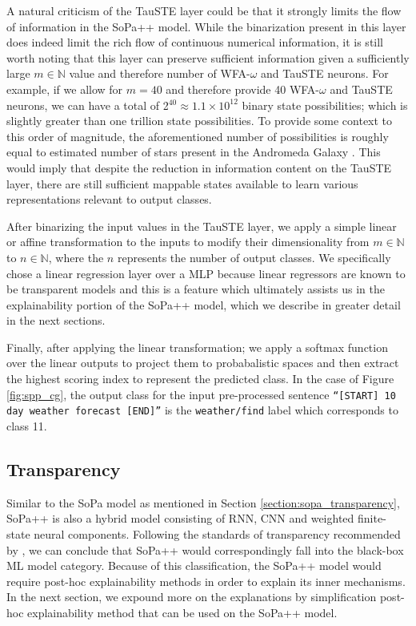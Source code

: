 A natural criticism of the TauSTE layer could be that it strongly limits the
flow of information in the SoPa++ model. While the binarization present in this
layer does indeed limit the rich flow of continuous numerical information, it is
still worth noting that this layer can preserve sufficient information given a
sufficiently large $m \in \mathbb{N}$ value and therefore number of WFA-$\omega$
and TauSTE neurons. For example, if we allow for $m=40$ and therefore provide 40
WFA-$\omega$ and TauSTE neurons, we can have a total of
2$^{40}\approx1.1\times10^{12}$ binary state possibilities; which is slightly
greater than one trillion state possibilities. To provide some context to this
order of magnitude, the aforementioned number of possibilities is roughly equal
to estimated number of stars present in the Andromeda Galaxy
\citep{10.1093/mnras/stu879}. This would imply that despite the reduction in
information content on the TauSTE layer, there are still sufficient mappable
states available to learn various representations relevant to output classes.

After binarizing the input values in the TauSTE layer, we apply a simple linear
or affine transformation to the inputs to modify their dimensionality from $m
\in \mathbb{N}$ to $n \in \mathbb{N}$, where the $n$ represents the number of
output classes. We specifically chose a linear regression layer over a MLP
because linear regressors are known to be transparent models
\citep{arrieta2020explainable} and this is a feature which ultimately assists us
in the explainability portion of the SoPa++ model, which we describe in greater
detail in the next sections.

Finally, after applying the linear transformation; we apply a softmax function
over the linear outputs to project them to probabalistic spaces and then extract
the highest scoring index to represent the predicted class. In the case of
Figure \ref{fig:spp_cg}, the output class for the input pre-processed sentence
\texttt{``[START] 10 day weather forecast [END]''} is the \texttt{weather/find} label
which corresponds to class 11.

\subsection{Transparency}

Similar to the SoPa model as mentioned in Section
\ref{section:sopa_transparency}, SoPa++ is also a hybrid model consisting of
RNN, CNN and weighted finite-state neural components. Following the standards of
transparency recommended by \citet{arrieta2020explainable}, we can conclude that
SoPa++ would correspondingly fall into the black-box ML model category. Because
of this classification, the SoPa++ model would require post-hoc explainability
methods in order to explain its inner mechanisms. In the next section, we
expound more on the explanations by simplification post-hoc explainability
method that can be used on the SoPa++ model.

